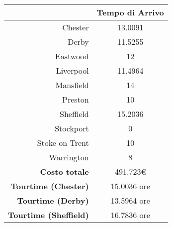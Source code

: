 
		\begin{table}[H]
			\small
			\centering
			\label{table:instance_5_arrival}
			\begin{tabular}{rc}

				\toprule
				& Tempo di Arrivo \\

				\midrule
				Chester & 13.0091 \\
				Derby & 11.5255 \\
				Eastwood & 12 \\
				Liverpool & 11.4964 \\
				Mansfield & 14 \\
				Preston  & 10 \\
				Sheffield & 15.2036 \\
				Stockport & 0 \\
				Stoke on Trent & 10 \\
				Warrington & 8 \\


				\midrule
				\textbf{Costo totale} & 491.723€ \\
				\textbf{Tourtime (Chester)} & 15.0036 ore \\
				\textbf{Tourtime (Derby)} & 13.5964 ore \\
				\textbf{Tourtime (Sheffield)} & 16.7836 ore \\
				\bottomrule
			\end{tabular}
		\end{table}

